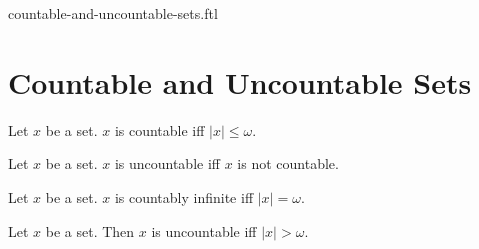 \documentclass{naproche-library}
\begin{document}
\begin{smodule}{countable-and-uncountable-sets.ftl}

  \section*{Countable and Uncountable Sets}

  \begin{definition}[forthel,id=SET_THEORY_07_8808604616359936]
    Let $x$ be a set.
    $x$ is countable iff $|x| \leq \omega$.
  \end{definition}

  \begin{definition}[forthel,id=SET_THEORY_07_2935263915409408]
    Let $x$ be a set.
    $x$ is uncountable iff $x$ is not countable.
  \end{definition}

  \begin{definition}[forthel,id=SET_THEORY_07_5679866426949632]
    Let $x$ be a set.
    $x$ is countably infinite iff $|x| = \omega$.
  \end{definition}

  \begin{proposition}[forthel,id=SET_THEORY_07_4281623468048384]
    Let $x$ be a set.
    Then $x$ is uncountable iff $|x| > \omega$.
  \end{proposition}
\end{smodule}
\end{document}
